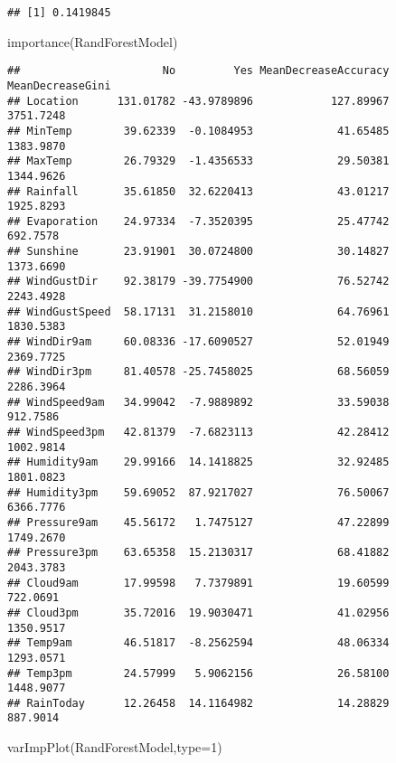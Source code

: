 \documentclass[
]{article}
\newenvironment{Shaded}{\begin{snugshade}}{\end{snugshade}}
\newcommand{\AttributeTok}[1]{\textcolor[rgb]{0.77,0.63,0.00}{#1}}
\newcommand{\DecValTok}[1]{\textcolor[rgb]{0.00,0.00,0.81}{#1}}
\newcommand{\FunctionTok}[1]{\textcolor[rgb]{0.00,0.00,0.00}{#1}}
\newcommand{\NormalTok}[1]{#1}
\begin{document}
\begin{verbatim}
## [1] 0.1419845
\end{verbatim}

\begin{Shaded}
\begin{Highlighting}[]
\FunctionTok{importance}\NormalTok{(RandForestModel)}
\end{Highlighting}
\end{Shaded}

\begin{verbatim}
##                      No         Yes MeanDecreaseAccuracy MeanDecreaseGini
## Location      131.01782 -43.9789896            127.89967        3751.7248
## MinTemp        39.62339  -0.1084953             41.65485        1383.9870
## MaxTemp        26.79329  -1.4356533             29.50381        1344.9626
## Rainfall       35.61850  32.6220413             43.01217        1925.8293
## Evaporation    24.97334  -7.3520395             25.47742         692.7578
## Sunshine       23.91901  30.0724800             30.14827        1373.6690
## WindGustDir    92.38179 -39.7754900             76.52742        2243.4928
## WindGustSpeed  58.17131  31.2158010             64.76961        1830.5383
## WindDir9am     60.08336 -17.6090527             52.01949        2369.7725
## WindDir3pm     81.40578 -25.7458025             68.56059        2286.3964
## WindSpeed9am   34.99042  -7.9889892             33.59038         912.7586
## WindSpeed3pm   42.81379  -7.6823113             42.28412        1002.9814
## Humidity9am    29.99166  14.1418825             32.92485        1801.0823
## Humidity3pm    59.69052  87.9217027             76.50067        6366.7776
## Pressure9am    45.56172   1.7475127             47.22899        1749.2670
## Pressure3pm    63.65358  15.2130317             68.41882        2043.3783
## Cloud9am       17.99598   7.7379891             19.60599         722.0691
## Cloud3pm       35.72016  19.9030471             41.02956        1350.9517
## Temp9am        46.51817  -8.2562594             48.06334        1293.0571
## Temp3pm        24.57999   5.9062156             26.58100        1448.9077
## RainToday      12.26458  14.1164982             14.28829         887.9014
\end{verbatim}

\begin{Shaded}
\begin{Highlighting}[]
\FunctionTok{varImpPlot}\NormalTok{(RandForestModel,}\AttributeTok{type=}\DecValTok{1}\NormalTok{)}
\end{Highlighting}
\end{Shaded}
\end{document}
